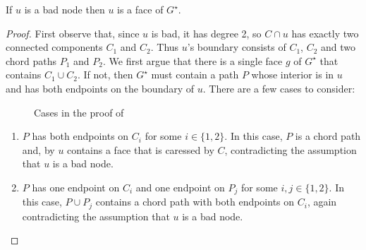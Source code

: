 \documentclass{patmorin}
\newcommand{\dual}[1]{{#1}^\star}
\begin{document}
\begin{lem}
   If $u$ is a bad node then $u$ is a face of $\dual{G}$.
\end{lem}

\begin{proof}
   First observe that, since $u$ is bad, it has degree 2, so $C\cap u$ has exactly two connected components $C_1$ and $C_2$. Thus $u$'s boundary
   consists of $C_1$, $C_2$ and two chord paths $P_1$ and $P_2$.  We first argue that there is a single face $g$ of $\dual{G}$ that contains $C_1\cup C_2$.  If not, then $\dual{G}$ must contain a path $P$ whose interior is in $u$ and has both endpoints on the boundary of $u$.  There are a few cases to consider:
   \begin{figure}
       \begin{center}
           \caption{Cases in the proof of }
       \end{center}
   \end{figure}
   \begin{enumerate}
       \item $P$ has both endpoints on $C_i$ for some $i\in\{1,2\}$. In
       this case, $P$ is a chord path and, by 
       $u$ contains a face that is caressed by $C$, contradicting the
       assumption that $u$ is a bad node.

       \item $P$ has one endpoint on $C_i$ and one endpoint on $P_j$
       for some $i,j\in\{1,2\}$.  In this case, $P\cup P_j$ contains a
       chord path with both endpoints on $C_i$, again contradicting the
       assumption that $u$ is a bad node.


\end{enumerate}
\end{proof}
\end{document}
